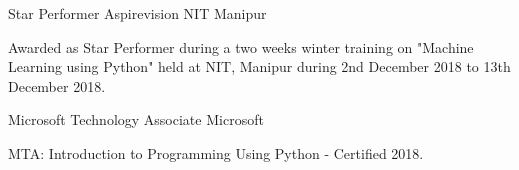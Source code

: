 
\begin{cventries}
  \cventry
    {Star Performer} %
    {Aspirevision} %
    {NIT Manipur} %
    {} %
    {
      \begin{cvitems} %
        \item {Awarded as Star Performer during a two weeks winter training on "Machine Learning using Python" held at NIT, Manipur during 2nd December 2018 to 13th December 2018.}
      \end{cvitems}
    }
  \cventry
    {Microsoft Technology Associate} %
    {Microsoft} %
    {} %
    {} %
    {
      \begin{cvitems} %
        \item {MTA: Introduction to Programming Using Python - Certified 2018.}
      \end{cvitems}
    }    
\end{cventries}
